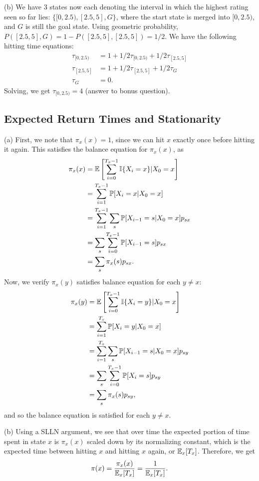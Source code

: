 (b) We have 3 states now each denoting the interval in which the highest rating seen so far lies: $\{[0, 2.5), [2.5, 5], G\}$, where the start state is merged into $[0, 2.5)$, and $G$ is still the goal state. Using geometric probability, $P([2.5, 5], G) = 1 - P([2.5, 5], [2.5, 5]) = 1/2$. We have the following hitting time equations:
\begin{align*}
    \tau_{[0, 2.5)} &= 1 + 1/2\tau_{[0, 2.5)} + 1/2\tau_{[2.5, 5]} \\
    \tau_{[2.5, 5]} &= 1 + 1/2\tau_{[2.5, 5]} + 1/2\tau_G \\
    \tau_G &= 0.
\end{align*}
Solving, we get $\tau_{[0, 2.5)} = \boxed{4}$ (answer to bonus question).


\subsection{Expected Return Times and Stationarity}

(a) First, we note that $\pi_x(x) = 1$, since we can hit $x$ exactly once before hitting it again. This satisfies the balance equation for $\pi_x(x)$, as
\begin{align*}
    \pi_x(x) &= \mathbb{E}\left[\sum_{i = 0}^{T_x - 1}\mathbb{I}\{X_i = x\} | X_0 = x\right] \\
    &= \sum_{i = 1}^{T_x - 1}\mathbb{P}[X_i = x | X_0 = x] \\
    &= \sum_{i = 1}^{T_x - 1}\sum_{s}\mathbb{P}[X_{i - 1} = s | X_0 = x]p_{sx} \\
    &= \sum_{s}\sum_{i = 0}^{T_x - 1}\mathbb{P}[X_{i - 1} = s]p_{sx} \\
    &= \sum_s\pi_x(s)p_{sx}.
\end{align*}
Now, we verify $\pi_x(y)$ satisfies balance equation for each $y \neq x$:
\begin{align*}
    \pi_x(y) &= \mathbb{E}\left[\sum_{i = 0}^{T_x - 1}\mathbb{I}\{X_i = y\} | X_0 = x\right] \\
    &= \sum_{i = 1}^{T_x}\mathbb{P}[X_i = y | X_0 = x] \\
    &= \sum_{i = 1}^{T_x}\sum_{s}\mathbb{P}[X_{i - 1} = s | X_0 = x]p_{sy} \\
    &= \sum_{s}\sum_{i = 0}^{T_x - 1}\mathbb{P}[X_{i} = s]p_{sy} \\
    &= \sum_s\pi_x(s)p_{sy},
\end{align*}
and so the balance equation is satisfied for each $y \neq x$.

(b) Using a SLLN argument, we see that over time the expected portion of time spent in state $x$ is $\pi_x(x)$ scaled down by its normalizing constant, which is the expected time between hitting $x$ and hitting $x$ again, or $\mathbb{E}_x[T_x]$. Therefore, we get
\[
\pi(x) = \frac{\pi_x(x)}{\mathbb{E}_x[T_x]} = \frac{1}{\mathbb{E}_x[T_x]}.
\]


